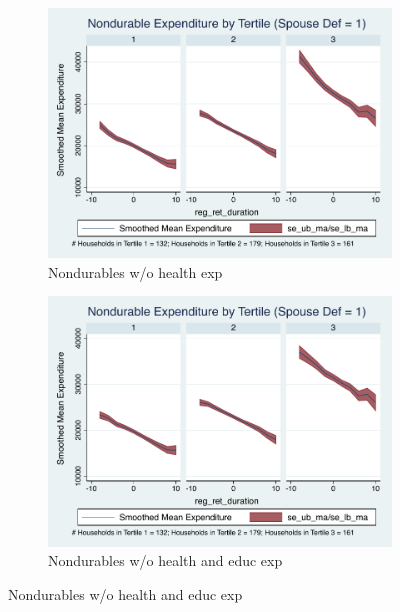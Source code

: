 \documentclass[11pt,onecolumn]{article}
\numberwithin{figure}{section}
\begin{document}
\begin{figure}
  \begin{subfigure}{0.5\textwidth}
  \centering
 	\includegraphics[width=0.9\linewidth]{../ConsumptionPostRetirement_by_SpouseDef/Smoothed_xhealth/post_2005/six_cats/spouse_def_1.pdf}
    \caption{Nondurables w/o health exp}
    \label{fig:chapter001_dist_001}
  \end{subfigure}
  	\hspace{1cm}
  \begin{subfigure}{0.5\textwidth}
 	\includegraphics[width=0.9\linewidth]{../ConsumptionPostRetirement_by_SpouseDef/Smoothed_xhealth_educ/post_2005/six_cats/spouse_def_1.pdf}
    \caption{Nondurables w/o health and educ exp}
    \label{fig:chapter001_reward_001}
  \end{subfigure}
  
\end{figure}
\clearpage
\end{document}
